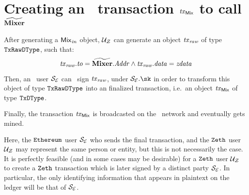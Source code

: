 
\section{Creating an \ethereum~transaction $\mathit{\mathit{tx}_{\mathsf{Mix}}}$ to call $\widetilde{\mathbf{Mixer}}$}\label{zeth-protocol:create-tx}

After generating a $\mathit{{\mathsf{Mix}}_{in}}$ object, $\mathcal{{U}_{Z}}$ can generate an object $\mathit{\mathit{tx}_{raw}}$ of type ${\mathtt{TxRawDType}}$, such that:
\[
    \mathit{\mathit{tx}_{raw}}.\mathit{to} = \widetilde{\mathbf{Mixer}}.\mathit{Addr} \land \mathit{\mathit{tx}_{raw}}.\mathit{data} = \mathit{zdata}
\]

Then, an \ethereum~user $\mathcal{{S}_{E}}$ can \ecdsa~sign $\mathit{\mathit{tx}_{raw}}$, under $\eparty{S}.\sk$ in order to transform this object of type ${\mathtt{TxRawDType}}$ into an finalized transaction, i.e.~an object $\mathit{\mathit{tx}_{\mathsf{Mix}}}$ of type ${\mathtt{TxDType}}$.

Finally, the transaction $\mathit{\mathit{tx}_{\mathsf{Mix}}}$ is broadcasted on the \ethereum~network and eventually gets mined.

\begin{notebox}
    Here, the $\texttt{Ethereum}{}$ user $\mathcal{{S}_{E}}$ who sends the final transaction, and the $\texttt{Zeth}$ user $\mathcal{{U}_{Z}}$ may represent the same person or entity, but this is not necessarily the case. It is perfectly feasible (and in some cases may be desirable) for a $\texttt{Zeth}$ user $\mathcal{{U}_{Z}}$ to create a $\texttt{Zeth}$ transaction which is later signed by a distinct party $\mathcal{{S}_{E}}$. In particular, the only identifying information that appears in plaintext on the ledger will be that of $\mathcal{{S}_{E}}$.
\end{notebox}
